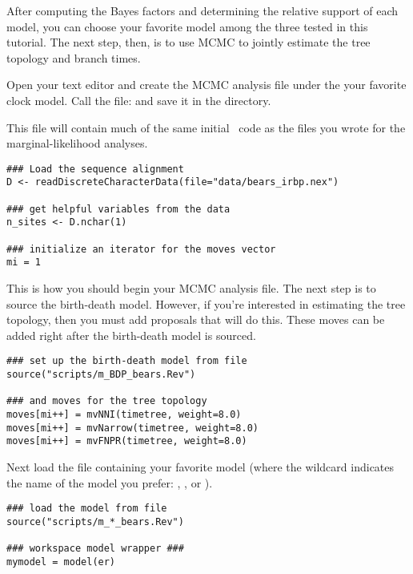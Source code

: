 After computing the Bayes factors and determining the relative support of each model, you can choose your favorite model among the three tested in this tutorial. 
The next step, then, is to use MCMC to jointly estimate the tree topology and branch times. 

{\begin{framed}
Open your text editor and create the MCMC analysis file under the your favorite clock model. Call the file: {\textcolor{red}{}} and save it in the  directory.
\end{framed}}

This file will contain much of the same initial \Rev~code as the files you wrote for the marginal-likelihood analyses. 

{\tt \begin{snugshade*}
\begin{lstlisting}
### Load the sequence alignment
D <- readDiscreteCharacterData(file="data/bears_irbp.nex")

### get helpful variables from the data
n_sites <- D.nchar(1)

### initialize an iterator for the moves vector
mi = 1
\end{lstlisting}
\end{snugshade*}}

This is how you should begin your MCMC analysis file. The next step is to source the birth-death model. 
However, if you're interested in estimating the tree topology, then you must add proposals that will do this.
These moves can be added right after the birth-death model is sourced.
{\tt \begin{snugshade*}
\begin{lstlisting}
### set up the birth-death model from file
source("scripts/m_BDP_bears.Rev")

### and moves for the tree topology
moves[mi++] = mvNNI(timetree, weight=8.0)
moves[mi++] = mvNarrow(timetree, weight=8.0)
moves[mi++] = mvFNPR(timetree, weight=8.0)
\end{lstlisting}
\end{snugshade*}}

Next load the file containing your favorite model (where the wildcard \cl{*} indicates the name of the model you prefer: , , or ).
{\tt \begin{snugshade*}
\begin{lstlisting}
### load the model from file 
source("scripts/m_*_bears.Rev")

### workspace model wrapper ###
mymodel = model(er)
\end{lstlisting}
\end{snugshade*}}

